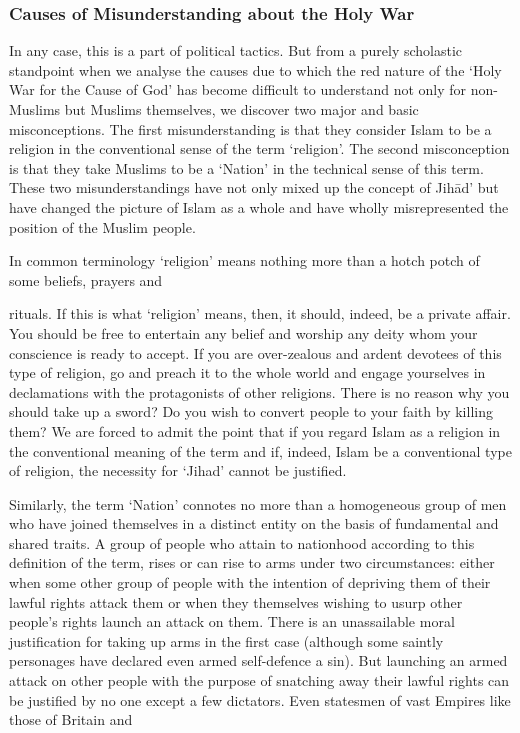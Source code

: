 \hypertarget{causes-of-misunderstanding-about-the-holy-war}{%
\subsubsection{Causes of Misunderstanding about the Holy
War}\label{causes-of-misunderstanding-about-the-holy-war}}

In any case, this is a part of political tactics. But from a purely
scholastic standpoint when we analyse the causes due to which the red
nature of the `Holy War for the Cause of God' has become difficult to
understand not only for non- Muslims but Muslims themselves, we discover
two major and basic misconceptions. The first misunderstanding is that
they consider Islam to be a religion in the conventional sense of the
term `religion'. The second misconception is that they take Muslims to
be a `Nation' in the technical sense of this term. These two
misunderstandings have not only mixed up the concept of Jihād' but have
changed the picture of Islam as a whole and have wholly misrepresented
the position of the Muslim people.

In common terminology `religion' means nothing more than a hotch potch
of some beliefs, prayers and

rituals. If this is what `religion' means, then, it should, indeed, be a
private affair. You should be free to entertain any belief and worship
any deity whom your conscience is ready to accept. If you are
over-zealous and ardent devotees of this type of religion, go and preach
it to the whole world and engage yourselves in declamations with the
protagonists of other religions. There is no reason why you should take
up a sword? Do you wish to convert people to your faith by killing them?
We are forced to admit the point that if you regard Islam as a religion
in the conventional meaning of the term and if, indeed, Islam be a
conventional type of religion, the necessity for `Jihad' cannot be
justified.

Similarly, the term `Nation' connotes no more than a homogeneous group
of men who have joined themselves in a distinct entity on the basis of
fundamental and shared traits. A group of people who attain to
nationhood according to this definition of the term, rises or can rise
to arms under two circumstances: either when some other group of people
with the intention of depriving them of their lawful rights attack them
or when they themselves wishing to usurp other people's rights launch an
attack on them. There is an unassailable moral justification for taking
up arms in the first case (although some saintly personages have
declared even armed self-defence a sin). But launching an armed attack
on other people with the purpose of snatching away their lawful rights
can be justified by no one except a few dictators. Even statesmen of
vast Empires like those of Britain and


